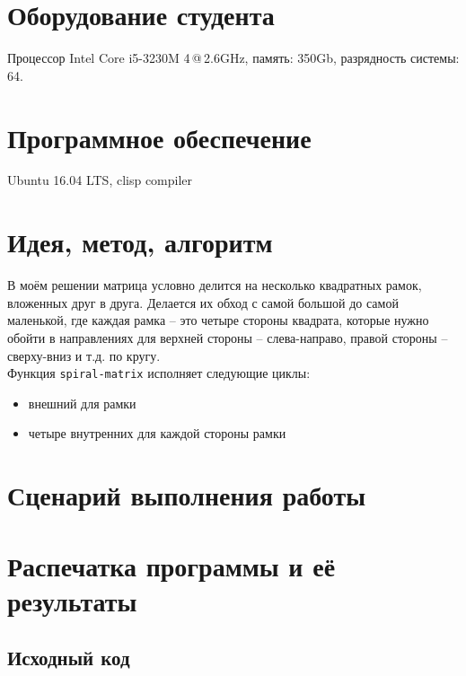 \documentclass[12pt]{article}
\begin{document}
\section{Оборудование студента}
Процессор Intel Core i5-3230M 4\,@\,2.6GHz, память: 350Gb, разрядность системы: 64.

\section{Программное обеспечение}
Ubuntu 16.04 LTS, clisp compiler

\section{Идея, метод, алгоритм}
В моём решении матрица условно делится на несколько квадратных рамок, вложенных друг в друга. Делается их обход с самой большой до самой маленькой, где каждая рамка -- это четыре стороны квадрата, которые нужно обойти в направлениях для верхней стороны -- слева-направо, правой стороны --  сверху-вниз и т.д. по кругу.\\

Функция {\tt spiral-matrix} исполняет следующие циклы:
\begin{itemize}
\setlength{\itemsep}{-1mm} %
\item внешний для рамки
\item четыре внутренних для каждой стороны рамки
\end{itemize}

\section{Сценарий выполнения работы}

\section{Распечатка программы и её результаты}

\subsection{Исходный код}
\end{document}
